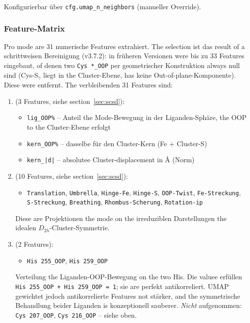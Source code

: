 \documentclass[11pt,a4paper,twoside]{article}
\theoremstyle{remark}
\begin{document}
Konfigurierbar \"uber \texttt{cfg.umap\_n\_neighbors} (manueller
Override).

\subsubsection*{Feature-Matrix}
\label{sec:embedding-features}

Pro mode are 31 numerische Features extrahiert. The selection ist
das result of a schrittweisen Bereinigung (v3.7.2): in fr\"uheren
Versionen were bis zu 33 Features eingebaut, of denen two
\texttt{Cys *\_OOP} per geometrischer Konstruktion always null sind
(Cys-S$_\gamma$ liegt in the Cluster-Ebene, has keine
Out-of-plane-Komponente). Diese were entfernt. The verbleibenden 31
Features sind:

\begin{enumerate}\setlength{\itemsep}{0pt}\setlength{\parsep}{0pt}
  \item[\textbf{Cluster-Ring-Anteile}] (3 Features, siehe
        section~\ref{sec:scsd}):
        \begin{itemize}\setlength{\itemsep}{0pt}
          \item \texttt{lig\_OOP\%} -- Anteil the Mode-Bewegung in der
                Liganden-Sph\"are, the OOP to the Cluster-Ebene erfolgt
          \item \texttt{kern\_OOP\%} -- dasselbe f\"ur den
                Cluster-Kern (Fe + Cluster-S)
          \item \texttt{kern\_|d|} -- absolutee Cluster-displacement in
                \AA{} (Norm)
        \end{itemize}

  \item[\textbf{Kern-Scores / D$_{2h}$-Irreps}] (10 Features, siehe
        section~\ref{sec:scsd}):
        \begin{itemize}\setlength{\itemsep}{0pt}
          \item \texttt{Translation}, \texttt{Umbrella},
                \texttt{Hinge-Fe}, \texttt{Hinge-S},
                \texttt{OOP-Twist}, \texttt{Fe-Streckung},
                \texttt{S-Streckung}, \texttt{Breathing},
                \texttt{Rhombus-Scherung}, \texttt{Rotation-ip}
        \end{itemize}
        Diese are Projektionen the mode on the irreduziblen
        Darstellungen the idealen $D_{2h}$-Cluster-Symmetrie.

  \item[\textbf{Liganden OOP-Anteile}] (2 Features):
        \begin{itemize}\setlength{\itemsep}{0pt}
          \item \texttt{His 255\_OOP}, \texttt{His 259\_OOP}
        \end{itemize}
        Verteilung the Liganden-OOP-Bewegung on the two His. Die
        valuee erf\"ullen \texttt{His 255\_OOP + His 259\_OOP = 1}; sie
        are perfekt antikorreliert. UMAP gewichtet jedoch
        antikorrelierte Features not st\"arker, and the symmetrische
        Behandlung beider Liganden is konzeptionell sauberer.
        \emph{Nicht} aufgenommen: \texttt{Cys 207\_OOP},
        \texttt{Cys 216\_OOP} -- siehe oben.


\end{enumerate}
\end{document}
